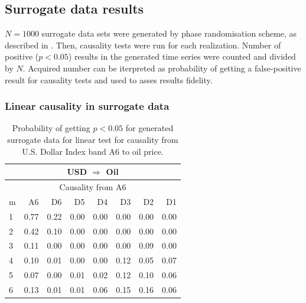 \subsection{Surrogate data results}

$N=1000$ surrogate data sets were generated by phase randomisation scheme, as described in .
Then, causality tests were run for each realization.
Number of positive ($p < 0.05$) results in the generated time series were counted and divided by $N$.
Acquired number can be iterpreted as probability of getting a false-positive result for causality tests and used to asses results fidelity.

\subsubsection{Linear causality in surrogate data}

%
%
\begin{table}[H]
\begin{center}
\begin{tabular}{l|r r r r r r r}
\hline\hline
\multicolumn{8}{c}{USD $\Rightarrow$ Oil}\\
\hline
\multicolumn{8}{c}{Causality from A6}\\
\hline\hline
m & A6 & D6 & D5 & D4 & D3 & D2 & D1 \\
\hline
1 & 0.77 & 0.22 & 0.00 & 0.00 & 0.00 & 0.00 & 0.00 \\
2 & 0.42 & 0.10 & 0.00 & 0.00 & 0.00 & 0.00 & 0.00 \\
3 & 0.11 & 0.00 & 0.00 & 0.00 & 0.00 & 0.09 & 0.00 \\
4 & 0.10 & 0.01 & 0.00 & 0.00 & 0.12 & 0.05 & 0.07 \\
5 & 0.07 & 0.00 & 0.01 & 0.02 & 0.12 & 0.10 & 0.06 \\
6 & 0.13 & 0.01 & 0.01 & 0.06 & 0.15 & 0.16 & 0.06 \\
\hline\hline
\end{tabular}
\caption{Probability of getting $p < 0.05$ for generated surrogate data for linear test for causality from U.S. Dollar Index band A6 to oil price.}
\end{center}
\end{table}

